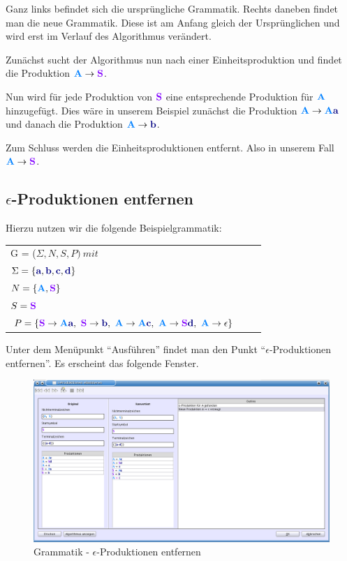 Ganz links befindet sich die ursprüngliche Grammatik. Rechts daneben findet man die neue Grammatik. Diese ist am Anfang gleich der Ursprünglichen und wird erst im Verlauf des Algorithmus verändert.

Zunächst sucht der Algorithmus nun nach einer Einheitsproduktion und findet die Produktion $\NonterminalSymbol{A} \to \StartSymbol{S}$.

Nun wird für jede Produktion von $\StartSymbol{S}$ eine entsprechende Produktion für $\NonterminalSymbol{A}$ hinzugefügt. Dies wäre in unserem Beispiel zunächst die Produktion $\NonterminalSymbol{A} \to \NonterminalSymbol{A}\TerminalSymbol{a}$ und danach die Produktion $\NonterminalSymbol{A} \to \TerminalSymbol{b}$.

Zum Schluss werden die Einheitsproduktionen entfernt. Also in unserem Fall $\NonterminalSymbol{A} \to \StartSymbol{S}$.

\subsection{$\epsilon$-Produktionen entfernen}

Hierzu nutzen wir die folgende Beispielgrammatik:

\begin{tabular}{lcr}
G = ($\Sigma, N, S, P )\ mit $\\
$\Sigma = \{\TerminalSymbol{a}, \TerminalSymbol{b}, \TerminalSymbol{c},
\TerminalSymbol{d}\}$\\ $N =
\{\NonterminalSymbol{A}, \StartSymbol{S}\}$\\ $S=\StartSymbol{S}$\\
$P = \{\StartSymbol{S} \to \NonterminalSymbol{A}\TerminalSymbol{a},\ \StartSymbol{S} \to \TerminalSymbol{b},\
\NonterminalSymbol{A}	\to \NonterminalSymbol{A}\TerminalSymbol{c},\ \NonterminalSymbol{A} \to \StartSymbol{S}\TerminalSymbol{d},\
\NonterminalSymbol{A} \to \epsilon\}$\\
\end{tabular}

Unter dem Menüpunkt "`Ausführen"' findet man den Punkt "`$\epsilon$-Produktionen entfernen"'. Es erscheint das folgende Fenster.

\begin{figure}[h]
\begin{center}
\includegraphics[width=12cm]{../images/epsilon_productions.png}
\caption{Grammatik - $\epsilon$-Produktionen entfernen}
\end{center}
\end{figure}

